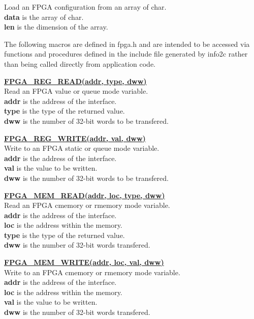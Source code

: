                 Load an FPGA configuration from an array of char.\\
                {\bf data} is the array of char.\\
                {\bf len} is the dimension of the array.

            The following macros are defined in fpga.h and are intended to
            be accessed via functions and procedures defined in the include
            file generated by info2c rather than being called directly from
            application code.

            \underline{{\bf FPGA\_REG\_READ(addr, type, dww)}} \\

                Read an FPGA value or queue mode variable.\\
                {\bf addr} is the address of the interface.\\
                {\bf type} is the type of the returned value.\\
                {\bf dww} is the number of 32-bit words to be transfered.

            \underline{{\bf FPGA\_REG\_WRITE(addr, val, dww)}} \\

                Write to an FPGA static or queue mode variable.\\
                {\bf addr} is the address of the interface.\\
                {\bf val} is the value to be written.\\
                {\bf dww} is the number of 32-bit words to be transfered.

            \underline{{\bf FPGA\_MEM\_READ(addr, loc, type, dww)}} \\

                Read an FPGA cmemory or rmemory mode variable.\\
                {\bf addr} is the address of the interface.\\
                {\bf loc} is the address within the memory.\\
                {\bf type} is the type of the returned value.\\
                {\bf dww} is the number of 32-bit words transfered.

            \underline{{\bf FPGA\_MEM\_WRITE(addr, loc, val, dww)}} \\

                Write to an FPGA cmemory or rmemory mode variable.\\
                {\bf addr} is the address of the interface.\\
                {\bf loc} is the address within the memory.\\
                {\bf val} is the value to be written.\\
                {\bf dww} is the number of 32-bit words transfered.


